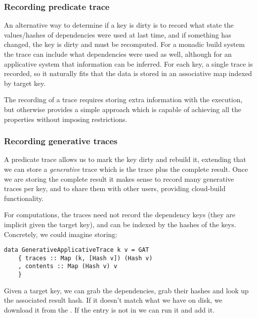 \subsubsection{Recording predicate trace}

An alternative way to determine if a key is dirty is to record what state the values/hashes of dependencies were used at last time, and if something has changed, the key is dirty and must be recomputed. For a monadic build system the trace can include what dependencies were used as well, although for an applicative system that information can be inferred. For each key, a single trace is recorded, so it naturally fits that the data is stored in an associative map indexed by target key.

The recording of a trace requires storing extra information with the execution, but otherwise provides a simple approach which is capable of achieving all the properties without imposing restrictions.

\subsubsection{Recording generative traces}

A predicate trace allows us to mark the key dirty and rebuild it, extending that we can store a \textit{generative} trace which is the trace plus the complete result. Once we are storing the complete result it makes sense to record many generative traces per key, and to share them with other users, providing cloud-build functionality.



For  computations, the traces need not record the dependency keys (they are implicit given the target key), and can be indexed by the hashes of the keys. Concretely, we could imagine storing:

\begin{verbatim}
data GenerativeApplicativeTrace k v = GAT
    { traces :: Map (k, [Hash v]) (Hash v)
    , contents :: Map (Hash v) v
    }
\end{verbatim}

Given a target key, we can grab the dependencies, grab their hashes and look up the associated result hash. If it doesn't match what we have on disk, we download it from the . If the entry is not in  we can run it and add it.

